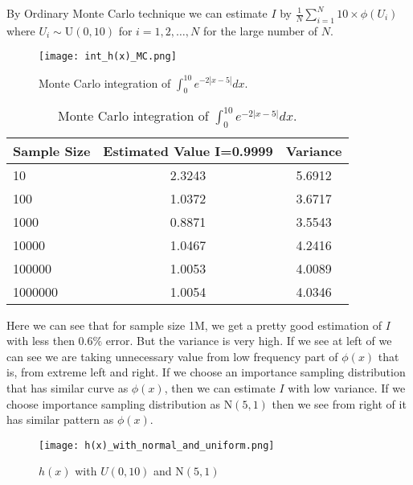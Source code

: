 \begin{example}
    By Ordinary Monte Carlo technique we can estimate $I$ by $\frac{1}{N}\sum_{i = 1}^{N} 10 \times \phi(U_i)$ where $U_i\sim \text{U}(0,10)$ for $i=1,2,\ldots,N$
	for the large number of $N$.
	\begin{figure}[H]
		\centering
		\texttt{[image: int\_h(x)\_MC.png]}
		\caption{Monte Carlo integration of $\int_{0}^{10} e^{-2 |x-5|} dx$.}
		\label{MC:IntegrationOFe-2|x*5|}
	\end{figure}
	\begin{table}[h]
		\centering
		\begin{tabular}{lcc}
			\hline
			Sample Size & Estimated Value I=0.9999 & Variance \\
			\hline
			10          & 2.3243                   & 5.6912   \\
			100         & 1.0372                   & 3.6717   \\
			1000        & 0.8871                   & 3.5543   \\
			10000       & 1.0467                   & 4.2416   \\
			100000      & 1.0053                   & 4.0089   \\
			1000000     & 1.0054                   & 4.0346   \\
			\hline
		\end{tabular}
		\caption{Monte Carlo integration of $\int_{0}^{10} e^{-2 |x-5|} dx$.}
		\label{tab:IntegrationOFe-2|x*5|}
	\end{table}
	Here we can see that for sample size 1M, we get a pretty good estimation of $I$ with less then $0.6\%$ error. But the variance is very high.
	If we see at left of  we can see we are taking unnecessary value from low frequency part of $\phi(x)$ that is,
	from extreme left and right. If we choose an importance sampling distribution that has similar curve as $\phi(x)$, then we can estimate $I$ with low variance.
    If we choose importance sampling distribution as $\text{N}(5,1)$ then we see from right of  it has similar pattern as $\phi(x)$.
	\begin{figure}[H]
		\centering
		\texttt{[image: h(x)\_with\_normal\_and\_uniform.png]}
        \caption{$h(x)$ with $U(0,10)$ and $\text{N}(5,1)$}
		\label{fig:hxwithU01andN01}
	\end{figure}


\end{example}
